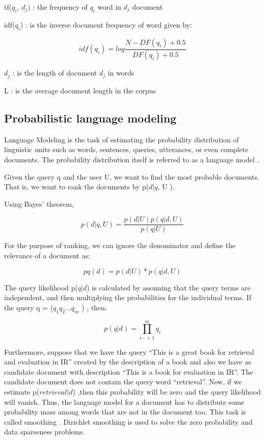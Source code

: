 tf($q_i$, $d_j$) : the frequency of $q_i$ word in $d_j$ document

idf($q_i$) : is the inverse document frequency of word given by:

\begin{equation}
idf(q_i) = log \frac{ N-DF(q_i) + 0.5 } { DF(q_i) +0.5 }
\end{equation}

$d_j$ : is the length of document $d_j$ in words

L : is the average document length in the corpus

\subsection{Probabilistic language modeling}

Language Modeling is the task of estimating the probability distribution of linguistic units such as words, sentences, queries, utterances, or even complete documents. The probability distribution itself is referred to as a language model \cite{CroftLafferty}.


Given the query q and the user U, we want to find the most probable documents. That is, we want to rank the documents by p($d|q$, U ).

Using Bayes' theorem,

\begin{equation}
p(d|q, U ) = \frac{p(d|U )p(q|d, U )} {p(q|U)}
\end{equation}

For the purpose of ranking, we can ignore the denominator and define the relevance of a document as:

\begin{equation}
pq (d) = p(d|U ) * p(q|d, U )
\end{equation}

The query likelihood p($q|d$) is calculated by assuming that the query terms are independent, and then multiplying the probabilities for the individual terms. If the query q = ($q_1 q_2 \ldots q_m$ ) , then:

\[p(q|d) =\prod_{i->1}^{m} q_i\]


Furthermore, suppose that we have the query ``This is a great book for retrieval and evaluation in IR'' created by the description of a book and also we have as candidate document with description ``This is a book for evaluation in IR''. The candidate document does not contain the query word ``retrieval''. Now, if we estimate p($retrieval|d$) ,then this probability will be zero and the query likelihood will vanish. Thus, the language model for a document has to distribute some probability mass among words that are not in the document too. This task is called smoothing  \cite{ZhaiLaferty}. Dirichlet smoothing is used to solve the zero probability and data sparseness problems.

